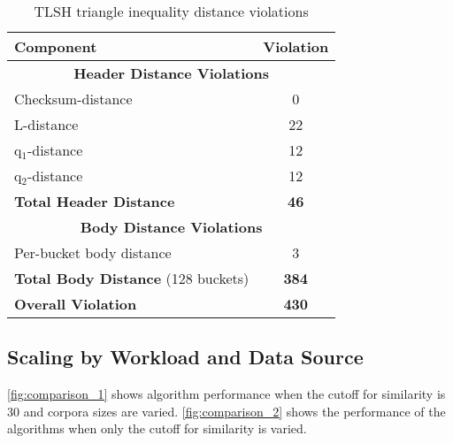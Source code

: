 \documentclass[5p,final]{elsarticle}
\begin{document}
\begin{table}[H]
	\centering
	\begin{tabular}{|l|c|}
		\hline
		\textbf{Component}                       & \textbf{Violation} \\ \hline
		\multicolumn{2}{|c|}{\textbf{Header Distance Violations}}     \\ \hline
		Checksum-distance                        & 0                  \\ \hline
		L-distance                               & 22                 \\ \hline
		q$_1$-distance                           & 12                 \\ \hline
		q$_2$-distance                           & 12                 \\ \hline
		\textbf{Total Header Distance}           & \textbf{46}        \\ \hline
		\multicolumn{2}{|c|}{\textbf{Body Distance Violations}}       \\ \hline
		Per-bucket body distance                 & 3                  \\ \hline
		\textbf{Total Body Distance} (128 buckets) & \textbf{384}     \\ \hline
		\textbf{Overall Violation}               & \textbf{430}       \\ \hline
	\end{tabular}
	\caption{TLSH triangle inequality distance violations}
	\label{tab:tlsh_violations}
\end{table}

\vspace*{-1.5\baselineskip}

\subsection{Scaling by Workload and Data Source}
\autoref{fig:comparison_1} shows algorithm performance when the
cutoff for similarity is 30 and corpora sizes are varied.
\autoref{fig:comparison_2} shows the performance of the algorithms
when only the cutoff for similarity is varied.

\clearpage
\end{document}
